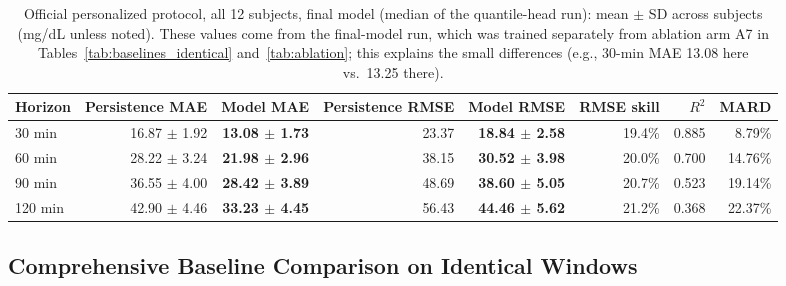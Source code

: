 \documentclass[journal]{IEEEtran}
\begin{document}
\begin{table}[t]
\centering
\caption{Official personalized protocol, all 12 subjects, final model (median of the quantile-head run): mean $\pm$ SD across subjects (mg/dL unless noted). These values come from the final-model run, which was trained separately from ablation arm A7 in Tables~\ref{tab:baselines_identical} and~\ref{tab:ablation}; this explains the small differences (e.g., 30-min MAE 13.08 here vs.\ 13.25 there).}
\label{tab:official}
\footnotesize
\begin{tabular}{lrrrrrrr}
\toprule
Horizon & Persistence MAE & Model MAE & Persistence RMSE & Model RMSE & RMSE skill & $R^2$ & MARD \\
\midrule
30 min & 16.87 $\pm$ 1.92 & \textbf{13.08 $\pm$ 1.73} & 23.37 & \textbf{18.84 $\pm$ 2.58} & 19.4\% & 0.885 & 8.79\% \\
60 min & 28.22 $\pm$ 3.24 & \textbf{21.98 $\pm$ 2.96} & 38.15 & \textbf{30.52 $\pm$ 3.98} & 20.0\% & 0.700 & 14.76\% \\
90 min & 36.55 $\pm$ 4.00 & \textbf{28.42 $\pm$ 3.89} & 48.69 & \textbf{38.60 $\pm$ 5.05} & 20.7\% & 0.523 & 19.14\% \\
120 min & 42.90 $\pm$ 4.46 & \textbf{33.23 $\pm$ 4.45} & 56.43 & \textbf{44.46 $\pm$ 5.62} & 21.2\% & 0.368 & 22.37\% \\
\bottomrule
\end{tabular}
\end{table}

\subsection{Comprehensive Baseline Comparison on Identical Windows}
\label{sec:baselines_identical}
\end{document}
